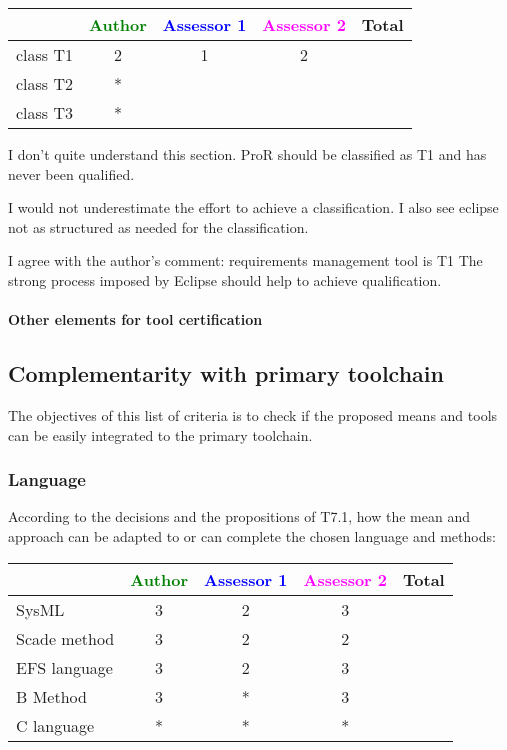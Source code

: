 \begin{tabular}{|l | c | c | c | c|}
\hline
& \textcolor{green}{Author} & \textcolor{blue}{Assessor 1} & \textcolor{magenta}{Assessor 2} & Total \\
\hline
class T1 & 2 & 1 & 2 &  \\
\hline
class T2   & * & & & \\
\hline
class T3  & * & & & \\
\hline
\end{tabular}

\begin{author_comment}
I don't quite understand this section.  ProR should be classified as T1 and has never been qualified.
\end{author_comment}

\begin{assessor1}
I would not underestimate the effort to achieve a classification. I also see eclipse not as structured as needed for the classification.
\end{assessor1}

\begin{assessor2}
I agree with the author's comment: requirements management tool is T1 The strong process imposed by Eclipse should help to achieve qualification.
\end{assessor2}

\paragraph{Other elements for tool certification}


\subsection{Complementarity with primary toolchain}

The objectives of this list of criteria is to check if the proposed means and tools can be easily integrated to the primary toolchain.

\subsubsection{Language}


According to the decisions and the propositions of T7.1, how the mean and approach can be adapted to or can complete the chosen language and methods:

\begin{tabular}{|l | c | c | c | c|}
\hline
& \textcolor{green}{Author} & \textcolor{blue}{Assessor 1} & \textcolor{magenta}{Assessor 2} & Total \\
\hline
SysML  & 3 & 2 & 3 & \\
\hline
Scade method & 3 & 2 & 2 & \\
\hline
EFS language & 3 & 2 & 3 & \\
\hline
B Method & 3 & * & 3 & \\
\hline
C language & * & * & * & \\
\hline
\end{tabular}


